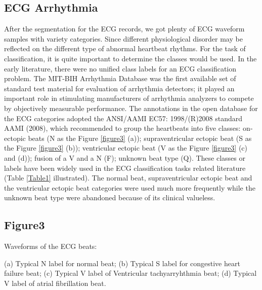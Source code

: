\documentclass{bmcart}
\begin{document}
\subsection*{ECG Arrhythmia}

After the segmentation for the ECG records, we got plenty of ECG waveform samples with variety categories. Since different physiological disorder may be reflected on the different type of abnormal heartbeat rhythms. For the task of classification, it is quite important to determine the classes would be used. In the early literature, there were no unified class labels for an ECG classification problem. The MIT-BIH Arrhythmia Database was the first available set of standard test material for evaluation of arrhythmia detectors; it played an important role in stimulating manufacturers of arrhythmia analyzers to compete by objectively measurable performance. The annotations in the open database for the ECG categories adopted the ANSI/AAMI EC57: 1998/(R)2008 standard AAMI (2008), which recommended to group the heartbeats into five classes: on-ectopic beats (N as the Figure \ref{figure3} (a)); supraventricular ectopic beat (S as the Figure \ref{figure3} (b)); ventricular ectopic beat (V as the Figure \ref{figure3} (c) and (d)); fusion of a V and a N (F); unknown beat type (Q). These classes or labels have been widely used in the ECG classification tasks related literature (Table \ref{Table1} illustrated). 
The normal beat, supraventricular ectopic beat and the ventricular ectopic beat categories were used much more frequently while the unknown beat type were abandoned because of its clinical valueless.  



\subsection*{Figure3}

Waveforms of the ECG beats:

 (a) Typical N label for normal beat; (b) Typical S label for congestive heart failure beat; (c) Typical V label of Ventricular tachyarryhthmia beat; (d) Typical V label of atrial fibrillation beat.


 
\end{document}
